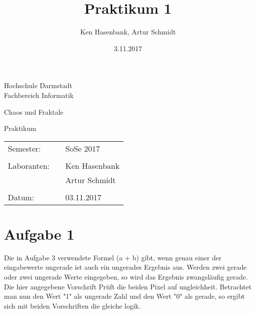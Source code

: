 \documentclass[10pt,a4paper]{article}
\author{Ken Hasenbank, Artur Schmidt}
\title{Praktikum 1}
\date{3.11.2017}
\begin{document}

\begin{titlepage}
\begin{center}
	\Large{Hochschule Darmstadt}\\
	\large{Fachbereich Informatik}
\end{center}

\vspace{1cm}
\begin{center}
	\large{Chaos und Fraktale}
\end{center}

\vspace{2,5cm}
\begin{center}
	\huge{Praktikum}\\
\end{center}



\vspace{6cm}
\begin{center}
{\large 
\begin{tabular}{lll}
	Semester: && SoSe 2017\\
	\vspace{1mm}\\
	Laboranten: && Ken Hasenbank\\
	&& Artur Schmidt\\
	\vspace{1 mm}\\
	Datum:	&& 03.11.2017\\
	\end{tabular} 
	}%
\end{center}

\end{titlepage}

\section{Aufgabe 1}
Die in Aufgabe 3 verwendete Formel (a + b) gibt, wenn genau einer der eingabewerte ungerade ist auch ein ungerades Ergebnis aus. Werden zwei gerade oder zwei ungerade Werte eingegeben, so wird das Ergebnis zwangsläufig gerade.
\\
Die hier angegebene Vorschrift Prüft die beiden Pixel auf ungleichheit.
Betrachtet man nun den Wert "1" als ungerade Zahl und den Wert "0" als gerade, so ergibt sich mit beiden Vorschriften die gleiche logik.
\end{document}
